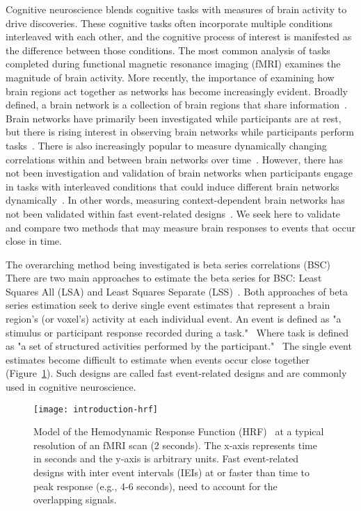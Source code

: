 \documentclass[phd,figures,tables,ackpage,abstractpage,publicabstractpage]{uithesis}
\begin{document}
Cognitive neuroscience blends cognitive tasks with measures of brain activity to drive discoveries.
These cognitive tasks often incorporate multiple conditions interleaved with each other,
and the cognitive process of interest is manifested as the difference between those conditions.
The most common analysis of tasks completed during functional magnetic resonance imaging (fMRI)
examines the magnitude of brain activity.
More recently, the importance of examining how brain regions act together as networks has become increasingly evident.
Broadly defined, a brain network is a collection of brain regions that share information~\cite{Uddin2019}.
Brain networks have primarily been investigated while participants are at rest, but there
is rising interest in observing brain networks while participants perform tasks~\cite{Cole2014a}.
There is also increasingly popular to measure dynamically changing correlations
within and between brain networks over time~\cite{Sakoglu2008,Hindriks2016}.
However, there has not been investigation and validation of brain networks
when participants engage in tasks with interleaved conditions that could induce
different brain networks dynamically~\cite{Di2019a}.
In other words, measuring context-dependent brain networks has not been validated within fast event-related designs~\cite{Buckner1998}.
We seek here to validate and compare two methods that may measure brain responses to events that occur
close in time.

The overarching method being investigated is beta series correlations (BSC)~\cite{Rissman2004,Mumford2012,Turner2012a,Abdulrahman2016}
There are two main approaches to estimate the beta series for BSC: Least Squares All (LSA) and Least Squares Separate (LSS)~\cite{Mumford2012}.
Both approaches of beta series estimation seek to derive single event estimates that represent a brain region's
(or voxel's) activity at each individual event.
An event is defined as "a stimulus or participant response recorded during a task."~\cite{Gorgolewski2016}
Where task is defined as "a set of structured activities performed by the participant."~\cite{Gorgolewski2016}
The single event estimates become difficult to estimate when events occur close together (Figure~\ref{fig:introhrf}).
Such designs are called fast event-related designs and are commonly
used in cognitive neuroscience.

\begin{figure}[H]
  \centering
  \texttt{[image: introduction-hrf]}
  \caption[Model of the Hemodynamic Response Function (HRF)]{
    Model of the Hemodynamic Response Function (HRF)~\cite{Glover1999} at a
    typical resolution of an fMRI scan (2 seconds). The x-axis represents time in seconds and the y-axis is arbitrary units.
    Fast event-related designs with inter event intervals (IEIs) at or faster than time to peak
    response (e.g., 4-6 seconds), need to account for the overlapping signals.
  }
  \label{fig:introhrf}
\end{figure}
\end{document}

